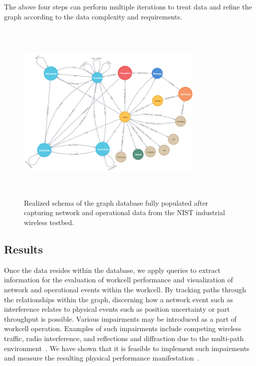 The above four steps can perform multiple iterations to treat data and refine the graph according to the data complexity and requirements.  
%
\begin{figure}
	\centering
	\includegraphics[width=0.8\textwidth,height=3.5in]{chapter-gdb-appl/figures/database/graph_schema_updated_2.png}
	\caption{Realized schema of the graph database fully populated after capturing network and operational data from the NIST industrial wireless testbed. \vspace{-0.2in}}
	\label{gdbappl:fig:real-schema}
\end{figure}

\subsection{Results} \label{gdbappl:sec:results}

Once the data resides within the database, we apply queries to extract information for the evaluation of workcell performance and visualization of network and operational events within the workcell. By tracking paths through the relationships within the graph, discerning how a network event such as interference relates to physical events such as position uncertainty or part throughput is possible. Various impairments may be introduced as a part of workcell operation.  Examples of such impairments include competing wireless traffic, radio interference, and reflections and diffraction due to the multi-path environment~\cite{Candell2017.NIST1951}. We have shown that it is feasible to implement such impairments and measure the resulting physical performance manifestation~\cite{Liu2019vancouver}. 


